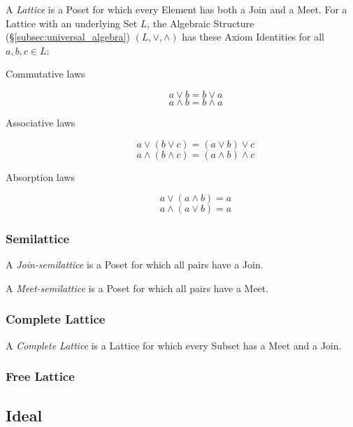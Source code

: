 \documentclass{article}
\begin{document}
A \emph{Lattice} is a Poset for which every Element has both a Join
and a Meet. For a Lattice with an underlying Set $L$, the Algebraic
Structure (\S\ref{subsec:universal_algebra}) $(L, \vee, \wedge)$ has
these Axiom Identities for all $a,b,c \in L$:
\begin{description}
\item[Commutative laws]
\[
    a \vee b = b \vee a
\] \[
    a \wedge b = b \wedge a
\]
\item[Associative laws]
\[
    a \vee (b \vee c) = (a \vee b) \vee c
\] \[
    a \wedge (b \wedge c) = (a \wedge b) \wedge c
\]
\item[Absorption laws]
\[
    a \vee (a \wedge b) = a
\] \[
    a \wedge (a \vee b) = a
\]
\end{description}



\subsubsection{Semilattice}\label{subsec:semilattice}

A \emph{Join-semilattice} is a Poset for which all pairs have a Join.

A \emph{Meet-semilattice} is a Poset for which all pairs have a Meet.



\subsubsection{Complete Lattice}\label{subsec:complete_lattice}

A \emph{Complete Lattice} is a Lattice for which every Subset has a
Meet and a Join.



\subsubsection{Free Lattice}



\subsection{Ideal}\label{subsec:order_ideal}



\end{document}
